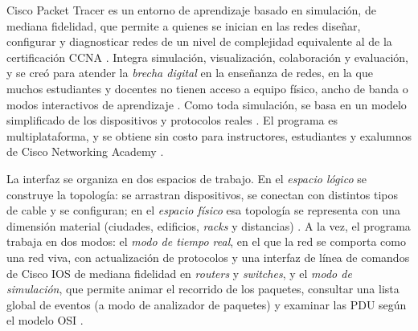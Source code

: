 Cisco Packet Tracer es un entorno de aprendizaje basado en simulación, de mediana fidelidad, que permite a quienes se inician en las redes diseñar, configurar y diagnosticar redes de un nivel de complejidad equivalente al de la certificación CCNA \cite{ciscopt:ayuda-introduccion}. Integra simulación, visualización, colaboración y evaluación, y se creó para atender la \emph{brecha digital} en la enseñanza de redes, en la que muchos estudiantes y docentes no tienen acceso a equipo físico, ancho de banda o modos interactivos de aprendizaje \cite{ciscopt:ayuda-introduccion, cisco:frezzo-blog}. Como toda simulación, se basa en un modelo simplificado de los dispositivos y protocolos reales \cite{ciscopt:ayuda-introduccion}. El programa es multiplataforma, y se obtiene sin costo para instructores, estudiantes y exalumnos de Cisco Networking Academy \cite{netacad:pt82-faq, wikipedia:packet-tracer}.

La interfaz se organiza en dos espacios de trabajo. En el \emph{espacio lógico} se construye la topología: se arrastran dispositivos, se conectan con distintos tipos de cable y se configuran; en el \emph{espacio físico} esa topología se representa con una dimensión material (ciudades, edificios, \emph{racks} y distancias) \cite{ciscopt:ayuda-introduccion}. A la vez, el programa trabaja en dos modos: el \emph{modo de tiempo real}, en el que la red se comporta como una red viva, con actualización de protocolos y una interfaz de línea de comandos de Cisco IOS de mediana fidelidad en \emph{routers} y \emph{switches}, y el \emph{modo de simulación}, que permite animar el recorrido de los paquetes, consultar una lista global de eventos (a modo de analizador de paquetes) y examinar las PDU según el modelo OSI \cite{ciscopt:ayuda-introduccion}.

